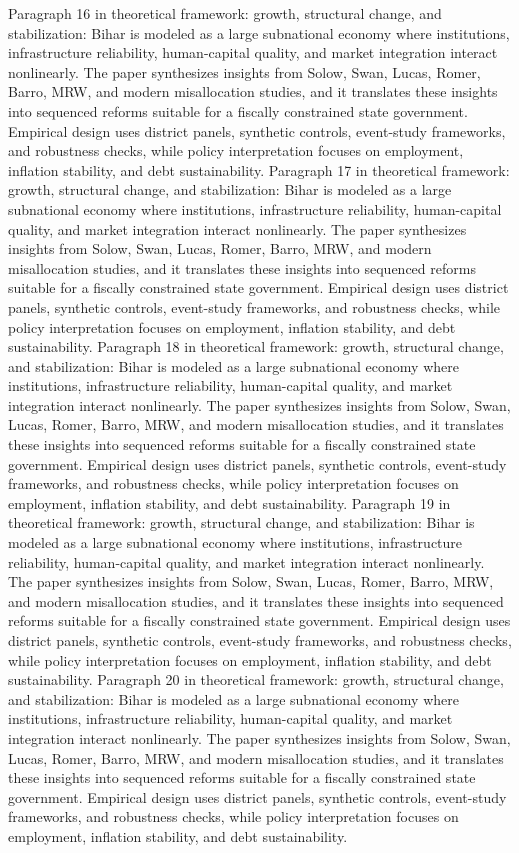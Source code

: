\documentclass[preprint,12pt]{elsarticle}
\begin{document}
Paragraph 16 in theoretical framework: growth, structural change, and stabilization: Bihar is modeled as a large subnational economy where institutions, infrastructure reliability, human-capital quality, and market integration interact nonlinearly. The paper synthesizes insights from Solow, Swan, Lucas, Romer, Barro, MRW, and modern misallocation studies, and it translates these insights into sequenced reforms suitable for a fiscally constrained state government. Empirical design uses district panels, synthetic controls, event-study frameworks, and robustness checks, while policy interpretation focuses on employment, inflation stability, and debt sustainability.
Paragraph 17 in theoretical framework: growth, structural change, and stabilization: Bihar is modeled as a large subnational economy where institutions, infrastructure reliability, human-capital quality, and market integration interact nonlinearly. The paper synthesizes insights from Solow, Swan, Lucas, Romer, Barro, MRW, and modern misallocation studies, and it translates these insights into sequenced reforms suitable for a fiscally constrained state government. Empirical design uses district panels, synthetic controls, event-study frameworks, and robustness checks, while policy interpretation focuses on employment, inflation stability, and debt sustainability.
Paragraph 18 in theoretical framework: growth, structural change, and stabilization: Bihar is modeled as a large subnational economy where institutions, infrastructure reliability, human-capital quality, and market integration interact nonlinearly. The paper synthesizes insights from Solow, Swan, Lucas, Romer, Barro, MRW, and modern misallocation studies, and it translates these insights into sequenced reforms suitable for a fiscally constrained state government. Empirical design uses district panels, synthetic controls, event-study frameworks, and robustness checks, while policy interpretation focuses on employment, inflation stability, and debt sustainability.
Paragraph 19 in theoretical framework: growth, structural change, and stabilization: Bihar is modeled as a large subnational economy where institutions, infrastructure reliability, human-capital quality, and market integration interact nonlinearly. The paper synthesizes insights from Solow, Swan, Lucas, Romer, Barro, MRW, and modern misallocation studies, and it translates these insights into sequenced reforms suitable for a fiscally constrained state government. Empirical design uses district panels, synthetic controls, event-study frameworks, and robustness checks, while policy interpretation focuses on employment, inflation stability, and debt sustainability.
Paragraph 20 in theoretical framework: growth, structural change, and stabilization: Bihar is modeled as a large subnational economy where institutions, infrastructure reliability, human-capital quality, and market integration interact nonlinearly. The paper synthesizes insights from Solow, Swan, Lucas, Romer, Barro, MRW, and modern misallocation studies, and it translates these insights into sequenced reforms suitable for a fiscally constrained state government. Empirical design uses district panels, synthetic controls, event-study frameworks, and robustness checks, while policy interpretation focuses on employment, inflation stability, and debt sustainability.
\end{document}
